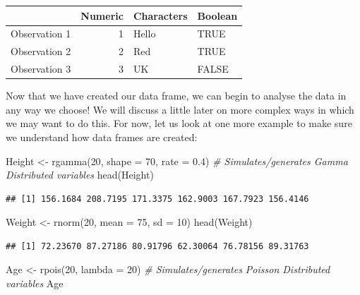 \documentclass[
]{book}
\newenvironment{Shaded}{\begin{snugshade}}{\end{snugshade}}
\newcommand{\AttributeTok}[1]{\textcolor[rgb]{0.77,0.63,0.00}{#1}}
\newcommand{\CommentTok}[1]{\textcolor[rgb]{0.56,0.35,0.01}{\textit{#1}}}
\newcommand{\DecValTok}[1]{\textcolor[rgb]{0.00,0.00,0.81}{#1}}
\newcommand{\FloatTok}[1]{\textcolor[rgb]{0.00,0.00,0.81}{#1}}
\newcommand{\FunctionTok}[1]{\textcolor[rgb]{0.00,0.00,0.00}{#1}}
\newcommand{\NormalTok}[1]{#1}
\newcommand{\OtherTok}[1]{\textcolor[rgb]{0.56,0.35,0.01}{#1}}
\theoremstyle{definition}
\theoremstyle{definition}
\theoremstyle{definition}
\theoremstyle{definition}
\theoremstyle{remark}
\begin{document}
\begin{tabular}{l|r|l|l}
\hline
  & Numeric & Characters & Boolean\\
\hline
Observation 1 & 1 & Hello & TRUE\\
\hline
Observation 2 & 2 & Red & TRUE\\
\hline
Observation 3 & 3 & UK & FALSE\\
\hline
\end{tabular}

Now that we have created our data frame, we can begin to analyse the data in any way we choose! We will discuss a little later on more complex ways in which we may want to do this. For now, let us look at one more example to make sure we understand how data frames are created:

\begin{Shaded}
\begin{Highlighting}[]
\NormalTok{Height }\OtherTok{\textless{}{-}} \FunctionTok{rgamma}\NormalTok{(}\DecValTok{20}\NormalTok{, }\AttributeTok{shape =} \DecValTok{70}\NormalTok{, }\AttributeTok{rate =} \FloatTok{0.4}\NormalTok{) }\CommentTok{\# Simulates/generates Gamma Distributed variables}
\FunctionTok{head}\NormalTok{(Height)}
\end{Highlighting}
\end{Shaded}

\begin{verbatim}
## [1] 156.1684 208.7195 171.3375 162.9003 167.7923 156.4146
\end{verbatim}

\begin{Shaded}
\begin{Highlighting}[]
\NormalTok{Weight }\OtherTok{\textless{}{-}} \FunctionTok{rnorm}\NormalTok{(}\DecValTok{20}\NormalTok{, }\AttributeTok{mean =} \DecValTok{75}\NormalTok{, }\AttributeTok{sd =} \DecValTok{10}\NormalTok{) }
\FunctionTok{head}\NormalTok{(Weight)}
\end{Highlighting}
\end{Shaded}

\begin{verbatim}
## [1] 72.23670 87.27186 80.91796 62.30064 76.78156 89.31763
\end{verbatim}

\begin{Shaded}
\begin{Highlighting}[]
\NormalTok{Age }\OtherTok{\textless{}{-}} \FunctionTok{rpois}\NormalTok{(}\DecValTok{20}\NormalTok{, }\AttributeTok{lambda =} \DecValTok{20}\NormalTok{) }\CommentTok{\# Simulates/generates Poisson Distributed variables}
\NormalTok{Age}
\end{Highlighting}
\end{Shaded}
\end{document}
